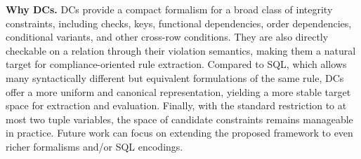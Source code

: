 \smallskip\noindent\textbf{Why DCs.}
DCs provide a compact formalism for a broad class of integrity constraints, including checks, keys, functional dependencies, order dependencies, conditional variants, and other cross-row conditions. They are also directly checkable on a relation through their violation semantics, making them a natural target for compliance-oriented rule extraction. Compared to SQL, which allows many syntactically different but equivalent formulations of the same rule, DCs offer a more uniform and canonical representation, yielding a more stable target space for extraction and evaluation. Finally, with the standard restriction to at most two tuple variables, the space of candidate constraints remains manageable in practice. Future work can focus on extending the proposed framework to even richer formalisms and/or SQL encodings.







%
